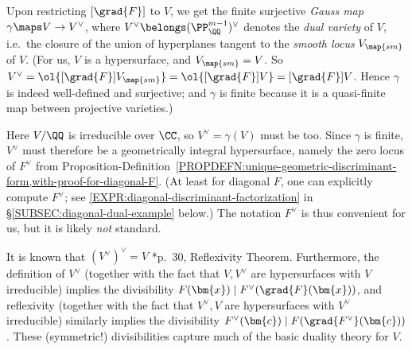 \documentclass[12pt]{report}
\begin{document}
Upon restricting $[\grad{F}]$ to $V$,
we get the finite surjective \emph{Gauss map} $\gamma\maps V\to V^\vee$,
where $V^\vee\belongs (\PP^{m-1}_\QQ)^\vee$ denotes the \emph{dual variety} of $V$,
i.e.~the closure of the union of
hyperplanes tangent to the \emph{smooth locus} $V_{\map{sm}}$ of $V$.
(For us,
$V$ is a hypersurface,
and $V_{\map{sm}}=V$.
So $V^\vee=\ol{[\grad{F}]V_{\map{sm}}}=\ol{[\grad{F}]V}=[\grad{F}]V$.
Hence $\gamma$ is indeed well-defined and surjective;
and $\gamma$ is finite because it is a quasi-finite map between projective varieties.)

Here $V/\QQ$ is irreducible over $\CC$,
so $V^\vee = \gamma(V)$ must be too.
Since $\gamma$ is finite, $V^\vee$ must therefore be a geometrically integral hypersurface,
namely the zero locus of $F^\vee$ from Proposition-Definition~\ref{PROPDEFN:unique-geometric-discriminant-form,with-proof-for-diagonal-F}.
(At least for diagonal $F$,
one can explicitly compute $F^\vee$;
see \eqref{EXPR:diagonal-discriminant-factorization} in \S\ref{SUBSEC:diagonal-dual-example} below.)
The notation $F^\vee$ is thus convenient for us, but it is likely \emph{not} standard.

It is known that $(V^\vee)^\vee=V$ \cite{dolgachev2012classical}*{p.~30, Reflexivity Theorem}.
Furthermore,
the definition of $V^\vee$
(together with the fact that $V,V^\vee$ are hypersurfaces with $V$ irreducible)
implies the divisibility $F(\bm{x})\mid F^\vee(\grad{F}(\bm{x}))$,
and reflexivity
(together with the fact that $V^\vee,V$ are hypersurfaces with $V^\vee$ irreducible)
similarly implies the divisibility $F^\vee(\bm{c})\mid F(\grad{F^\vee}(\bm{c}))$.
These (symmetric!) divisibilities capture much of the basic duality theory for $V$.
\end{document}
